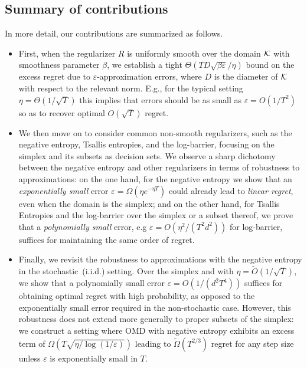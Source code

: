 \documentclass[10pt]{article}
\theoremstyle{definition}
\theoremstyle{remark}
\renewcommand{\epsilon}{\varepsilon}
\begin{document}
\subsection{Summary of contributions}
% 
In more detail, our contributions are summarized as follows.
% 
\begin{itemize}
    \item 
    First, when the regularizer $R$ is uniformly smooth over the domain $\cal K$ with smoothness parameter $\beta$, we establish a tight $\Theta(TD\sqrt{\beta\epsilon}/\eta)$ bound on the excess regret due to $\epsilon$-approximation errors,
    where $D$ is the diameter of $\cal K$ with respect to the relevant norm.
    E.g., for the typical setting $\eta = \Theta(1/\sqrt{T})$ this implies that errors should be as small as $\epsilon = O(1/T^2)$ so as to recover optimal $O(\sqrt{T})$ regret.

    \item
    We then move on to consider common non-smooth regularizers, such as the negative entropy, Tsallis entropies, and the log-barrier, focusing on the simplex and its subsets as decision sets. We observe a sharp dichotomy between the negative entropy and other regularizers in terms of robustness to approximations: on the one hand, for the negative entropy we show that an \emph{exponentially small} error  $\epsilon = \Omega(\eta e^{-\eta T})$ could already lead to \emph{linear regret}, even when the domain is the simplex; and on the other hand, for Tsallis Entropies and the log-barrier over the simplex or a subset thereof, we prove that a \emph{polynomially small} error, e.g $\epsilon = O(\eta^2/(T^2d^2))$ for log-barrier, suffices for maintaining the same order of regret.
    
    \item
    Finally, we revisit the robustness to approximations with the negative entropy in the stochastic~(i.i.d.) setting.
    Over the simplex and with $\eta = \widetilde O(1/\sqrt{T})$, we show that a polynomially small error $\epsilon = O(1/ (d^2T^4))$ suffices for obtaining optimal regret with high probability, as opposed to the exponentially small error required in the non-stochastic case.
    However, this robustness does not extend more generally to proper subsets of the simplex: we construct a setting where OMD with negative entropy exhibits an excess term of 
    $
        \Omega( T\sqrt{\eta / \log(1/\epsilon)} )
    $
    leading to $\widetilde \Omega(T^{2/3})$  regret for any step size 
    unless $\epsilon$ is exponentially small in $T$.
\end{itemize}
\end{document}
